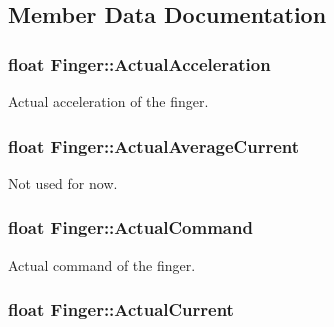 \subsection{Member Data Documentation}
\subsubsection[{\texorpdfstring{Actual\+Acceleration}{ActualAcceleration}}]{\setlength{\rightskip}{0pt plus 5cm}float Finger\+::\+Actual\+Acceleration}\hypertarget{struct_finger_a8f567a1b4f79cc476c293e231f4a640c}{}\label{struct_finger_a8f567a1b4f79cc476c293e231f4a640c}


Actual acceleration of the finger. 

\subsubsection[{\texorpdfstring{Actual\+Average\+Current}{ActualAverageCurrent}}]{\setlength{\rightskip}{0pt plus 5cm}float Finger\+::\+Actual\+Average\+Current}\hypertarget{struct_finger_abe8eb2782ebe64bacd24b5283d6bb64f}{}\label{struct_finger_abe8eb2782ebe64bacd24b5283d6bb64f}


Not used for now. 

\subsubsection[{\texorpdfstring{Actual\+Command}{ActualCommand}}]{\setlength{\rightskip}{0pt plus 5cm}float Finger\+::\+Actual\+Command}\hypertarget{struct_finger_a901a1c88ba688a7880e9070db8fee548}{}\label{struct_finger_a901a1c88ba688a7880e9070db8fee548}


Actual command of the finger. 

\subsubsection[{\texorpdfstring{Actual\+Current}{ActualCurrent}}]{\setlength{\rightskip}{0pt plus 5cm}float Finger\+::\+Actual\+Current}\hypertarget{struct_finger_ae1928102462f537b1392ca61d002c0bd}{}\label{struct_finger_ae1928102462f537b1392ca61d002c0bd}


